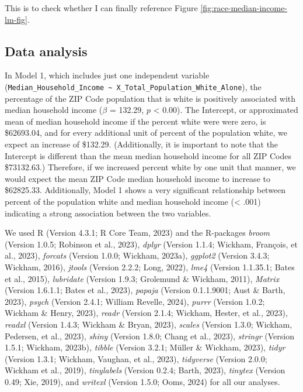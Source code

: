 \documentclass[
  man,floatsintext]{apa7}
\begin{document}
This is to check whether I can finally reference Figure \ref{fig:race-median-income-lm-fig}.

\hypertarget{data-analysis}{%
\subsection{Data analysis}\label{data-analysis}}

In Model 1, which includes just one independent variable (\texttt{Median\_Household\_Income\ \textasciitilde{}\ X\_Total\_Population\_White\_Alone}), the percentage of the ZIP Code population that is white is positively associated with median household income (\(\beta\) = 132.29, \(p\) \textless{} 0.00). The Intercept, or approximated mean of median household income if the percent white were were zero, is \$62693.04, and for every additional unit of percent of the population white, we expect an increase of \$132.29. (Additionally, it is important to note that the Intercept is different than the mean median household income for all ZIP Codes \$73132.63.) Therefore, if we increased percent white by one unit that manner, we would expect the mean ZIP Code median household income to increase to \$62825.33. Additionally, Model 1 shows a very significant relationship between percent of the population white and median household income (\textless{} .001) indicating a strong association between the two variables.

We used R (Version 4.3.1; R Core Team, 2023) and the R-packages \emph{broom} (Version 1.0.5; Robinson et al., 2023), \emph{dplyr} (Version 1.1.4; Wickham, François, et al., 2023), \emph{forcats} (Version 1.0.0; Wickham, 2023a), \emph{ggplot2} (Version 3.4.3; Wickham, 2016), \emph{jtools} (Version 2.2.2; Long, 2022), \emph{lme4} (Version 1.1.35.1; Bates et al., 2015), \emph{lubridate} (Version 1.9.3; Grolemund \& Wickham, 2011), \emph{Matrix} (Version 1.6.1.1; Bates et al., 2023), \emph{papaja} (Version 0.1.1.9001; Aust \& Barth, 2023), \emph{psych} (Version 2.4.1; William Revelle, 2024), \emph{purrr} (Version 1.0.2; Wickham \& Henry, 2023), \emph{readr} (Version 2.1.4; Wickham, Hester, et al., 2023), \emph{readxl} (Version 1.4.3; Wickham \& Bryan, 2023), \emph{scales} (Version 1.3.0; Wickham, Pedersen, et al., 2023), \emph{shiny} (Version 1.8.0; Chang et al., 2023), \emph{stringr} (Version 1.5.1; Wickham, 2023b), \emph{tibble} (Version 3.2.1; Müller \& Wickham, 2023), \emph{tidyr} (Version 1.3.1; Wickham, Vaughan, et al., 2023), \emph{tidyverse} (Version 2.0.0; Wickham et al., 2019), \emph{tinylabels} (Version 0.2.4; Barth, 2023), \emph{tinytex} (Version 0.49; Xie, 2019), and \emph{writexl} (Version 1.5.0; Ooms, 2024) for all our analyses.
\end{document}
